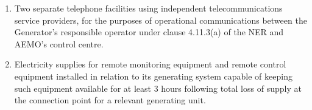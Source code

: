 \begin{enumerate}[label=(\arabic*)]
	\item Two separate telephone facilities using independent telecommunications service providers, for the purposes of operational communications between the Generator's responsible operator under clause 4.11.3(a) of the NER and AEMO’s control centre.
	\item Electricity supplies for remote monitoring equipment and remote control equipment installed in relation to its generating system capable of keeping such equipment available for at least 3 hours following total loss of supply at the connection point for a relevant generating unit.
\end{enumerate}
